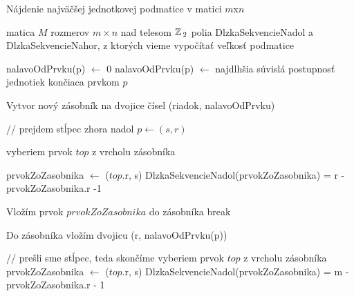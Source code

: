 \begin{algorithm}
\caption{Nájdenie najväčšej jednotkovej podmatice v matici  $m$x$n$}
\label{alg:largest_submatrix}
\begin{algorithmic}[1] %
\REQUIRE matica $M$ rozmerov $m \times n$ nad telesom $\mathbb{Z}\,_2$
\ENSURE polia DlzkaSekvencieNadol a DlzkaSekvencieNahor, z ktorých vieme vypočítať veľkosť podmatice


		\STATE nalavoOdPrvku(p) $\leftarrow$ 0
	\ELSE
		\STATE nalavoOdPrvku(p) $\leftarrow$ najdlhšia súvislá postupnosť jednotiek končiaca prvkom $p$
	\ENDIF	
\ENDFOR

	\STATE Vytvor nový zásobník na dvojice čísel (riadok, nalavoOdPrvku)

	\STATE // prejdem stĺpec zhora nadol
		\STATE $p \leftarrow (s, r)$
		
			\STATE vyberiem prvok $top$ z vrcholu zásobníka
						
				\STATE prvokZoZasobnika $\leftarrow$ ($top$.r, s)
				\STATE DlzkaSekvencieNadol(prvokZoZasobnika) = r - prvokZoZasobnika.r -1
			
			\ELSE
				\STATE Vložím prvok $prvokZoZasobnika$ do zásobníka
				\STATE break
			\ENDIF
		\ENDWHILE
		
		\STATE Do zásobníka vložím dvojicu (r, nalavoOdPrvku(p))
	\ENDFOR
	
	\STATE // prešli sme stĺpec, teda skončíme
		\STATE vyberiem prvok $top$ z vrcholu zásobníka
		\STATE prvokZoZasobnika $\leftarrow$ ($top$.r, s)
		\STATE DlzkaSekvencieNadol(prvokZoZasobnika) = m - prvokZoZasobnika.r - 1
		
	\ENDWHILE

	
\ENDFOR




\end{algorithmic}
\end{algorithm}


